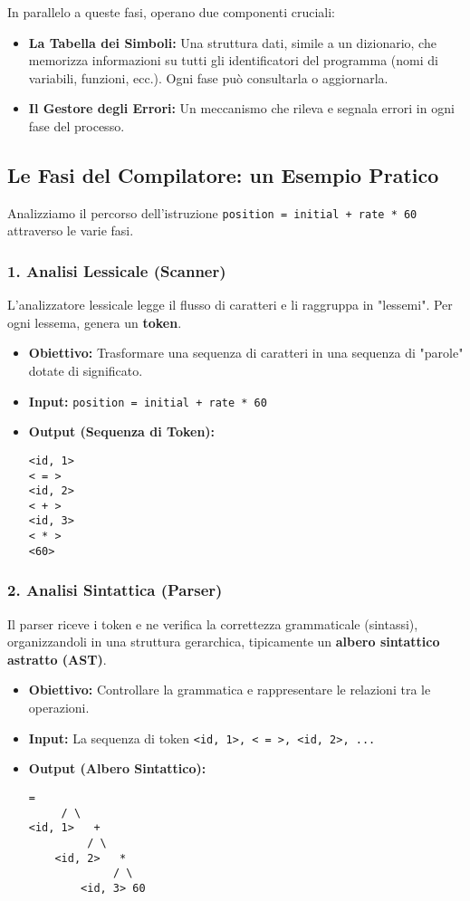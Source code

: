 \documentclass[a4paper, 11pt]{article}
\begin{document}
In parallelo a queste fasi, operano due componenti cruciali:
\begin{itemize}
    \item \textbf{La Tabella dei Simboli:} Una struttura dati, simile a un dizionario, che memorizza informazioni su tutti gli identificatori del programma (nomi di variabili, funzioni, ecc.). Ogni fase può consultarla o aggiornarla.
    \item \textbf{Il Gestore degli Errori:} Un meccanismo che rileva e segnala errori in ogni fase del processo.
\end{itemize}

\subsection{Le Fasi del Compilatore: un Esempio Pratico}
Analizziamo il percorso dell'istruzione \texttt{position = initial + rate * 60} attraverso le varie fasi.

\subsubsection{1. Analisi Lessicale (Scanner)}
L'analizzatore lessicale legge il flusso di caratteri e li raggruppa in "lessemi". Per ogni lessema, genera un \textbf{token}.
\begin{itemize}
    \item \textbf{Obiettivo:} Trasformare una sequenza di caratteri in una sequenza di "parole" dotate di significato.
    \item \textbf{Input:} \texttt{position = initial + rate * 60}
    \item \textbf{Output (Sequenza di Token):}
    \begin{verbatim}
<id, 1>
< = >
<id, 2>
< + >
<id, 3>
< * >
<60>
    \end{verbatim}
\end{itemize}

\subsubsection{2. Analisi Sintattica (Parser)}
Il parser riceve i token e ne verifica la correttezza grammaticale (sintassi), organizzandoli in una struttura gerarchica, tipicamente un \textbf{albero sintattico astratto (AST)}.
\begin{itemize}
    \item \textbf{Obiettivo:} Controllare la grammatica e rappresentare le relazioni tra le operazioni.
    \item \textbf{Input:} La sequenza di token \texttt{<id, 1>, < = >, <id, 2>, ...}
    \item \textbf{Output (Albero Sintattico):}
    \begin{Verbatim}[frame=single, label=Albero Sintattico Astratto (AST)]
      =
     / \
<id, 1>   +
         / \
    <id, 2>   *
             / \
        <id, 3> 60
    \end{Verbatim}
\end{itemize}
\end{document}
